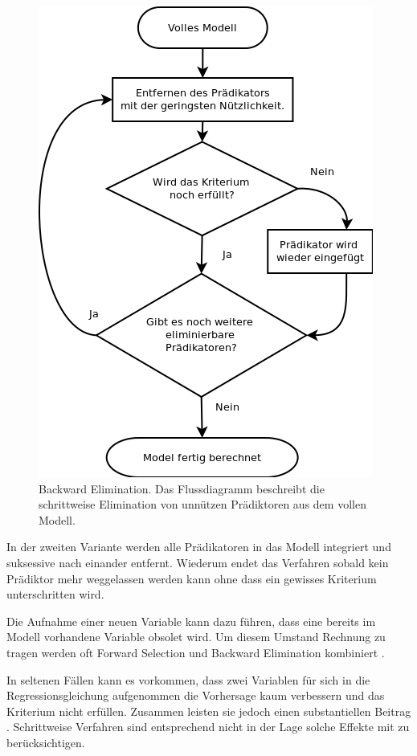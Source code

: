 \begin{figure}[H]
	\centering
	\includegraphics[height=0.5\textheight]{backward_stepwise.png}
	\caption{Backward Elimination. Das Flussdiagramm beschreibt die schrittweise Elimination von unnützen Prädiktoren aus dem vollen Modell.}
	\label{fig:backward_stepwise}
\end{figure}
In der zweiten Variante werden alle Prädikatoren in das Modell integriert und suksessive nach einander entfernt. Wiederum endet das Verfahren sobald kein Prädiktor mehr weggelassen werden kann ohne dass ein gewisses Kriterium unterschritten wird.

Die Aufnahme einer neuen Variable kann dazu führen, dass eine bereits im Modell vorhandene Variable obsolet wird. 
Um diesem Umstand Rechnung zu tragen werden oft Forward Selection und Backward Elimination kombiniert \cite[p. 461]{bortz2011}. 

In seltenen Fällen kann es vorkommen, dass zwei Variablen für sich in die Regressionsgleichung aufgenommen die Vorhersage kaum verbessern und das Kriterium nicht erfüllen. Zusammen leisten sie jedoch  einen substantiellen Beitrag \cite[p.261]{jacob2003applied}. 
Schrittweise Verfahren sind entsprechend nicht in der Lage solche Effekte mit zu berücksichtigen. 

